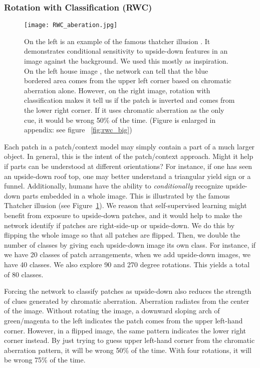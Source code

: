 \documentclass[10pt,twocolumn,letterpaper]{article}
\begin{document}
\subsubsection{Rotation with Classification (RWC)}

\begin{figure}
\centering
\texttt{[image: RWC\_aberation.jpg]}
\caption{On the left is an example of the famous thatcher illusion \cite{Thompson80,MTeffect06}. It demonstrates conditional sensitivity to upside-down features in an image against the background. We used this mostly as inspiration. On the left house image \cite{ChromaHouse}, the network can tell that the blue bordered area comes from the upper left corner based on chromatic aberration alone. However, on the right image, rotation with classification makes it tell us if the patch is inverted and comes from the lower right corner. If it uses chromatic aberration as the only cue, it would be wrong 50\% of the time. (Figure is enlarged in appendix: see figure ~\ref{fig:rwc_big})}
\label{fig:rwc}
\end{figure}
Each patch in a patch/context model may simply contain a part of a much larger object. In general, this is the intent of the patch/context approach. Might it help if parts can be understood at different orientations? For instance, if one has seen an upside-down roof top, one may better understand a triangular yield sign or a funnel. Additionally, humans have the ability to \emph{conditionally} recognize upside-down parts embedded in a whole image. This is illustrated by the famous Thatcher illusion \cite{Thompson80} (see Figure~\ref{fig:rwc}). We reason that self-supervised learning might benefit from exposure to upside-down patches, and it would help to make the network identify if patches are right-side-up or upside-down. We do this by flipping the whole image so that all patches are flipped. Then, we double the number of classes by giving each upside-down image its own class. For instance, if we have 20 classes of patch arrangements, when we add upside-down images, we have 40 classes. We also explore 90 and 270 degree rotations. This yields a total of 80 classes.

Forcing the network to classify patches as upside-down also reduces the strength of clues generated by chromatic aberration. Aberration radiates from the center of the image. Without rotating the image, a downward sloping arch of green/magenta to the left indicates the patch comes from the upper left-hand corner. However, in a flipped image, the same pattern indicates the lower right corner instead. By just trying to guess upper left-hand corner from the chromatic aberration pattern, it will be wrong 50\% of the time. With four rotations, it will be wrong 75\% of the time.   
\end{document}

